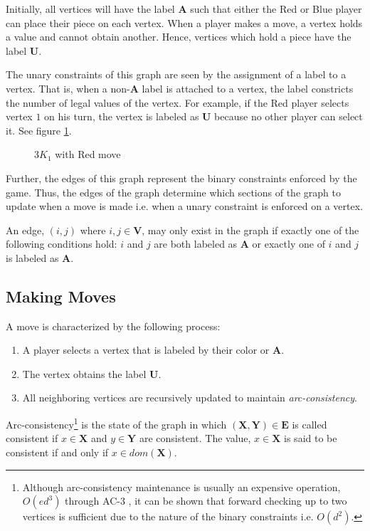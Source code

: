 \documentclass{sig-alternate}
\begin{document}
Initially, all vertices will have the label $\mathbf{A}$ such that either the
Red or Blue player can place their piece on each vertex. When a player makes a
move, a vertex holds a value and cannot obtain another. Hence, vertices which
hold a piece have the label $\mathbf{U}$.

The unary constraints of this graph are seen by the assignment of a label to a
vertex. That is, when a non-$\mathbf{A}$ label is attached to a vertex, the
label constricts the number of legal values of the vertex. For example, if the
Red player selects vertex $1$ on his turn, the vertex is labeled as $\mathbf{U}$
because no other player can select it. See figure \ref{fig:3K_1}.
\begin{figure}[h]
	\label{fig:3K_1}
	\centering
	\begin{tikzpicture}
	
	\end{tikzpicture}
	\caption{$3K_1$ with Red move}
\end{figure}

Further, the edges of this graph represent the binary constraints enforced by
the game. Thus, the edges of the graph determine which sections of the graph to
update when a move is made i.e. when a unary constraint is enforced on a
vertex.

An edge, $(i, j)$ where $i, j \in \mathbf{V}$, may only exist in the graph if
exactly one of the following conditions hold: $i$ and $j$ are both labeled as
$\mathbf{A}$ or exactly one of $i$ and $j$ is labeled as $\mathbf{A}$.

\subsection{Making Moves}

A move is characterized by the following process:
\begin{enumerate}
	\item A player selects a vertex that is labeled by their color or
		$\mathbf{A}$.
	\item The vertex obtains the label $\mathbf{U}$.
	\item All neighboring vertices are recursively updated to maintain
	\emph{arc-consistency}.
\end{enumerate}

Arc-consistency\footnote{Although arc-consistency maintenance is usually an
expensive operation, $O(ed^3)$ through AC-3 \cite{0023820},
it can be shown that forward checking up to two vertices is sufficient due to
the nature of the binary constraints i.e.  $O(d^2)$.} is the state of the graph
in which $(\mathbf{X}, \mathbf{Y})\in\mathbf{E}$ is called consistent if
$x\in\mathbf{X}$ and $y\in\mathbf{Y}$ are consistent. The value,
$x\in\mathbf{X}$ is said to be consistent if and only if $x\in
dom(\mathbf{X})$.
\end{document}
